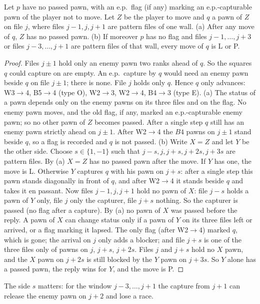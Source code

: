 \begin{wallproof}
\begin{lemma}
Let $p$ have no passed pawn, with an e.p.\ flag (if any) marking an e.p.-capturable pawn of the player not to move. Let $Z$ be the player to move and
$q$ a pawn of $Z$ on file $j$, where files $j-1,j,j+1$ are pattern files of one wall.
(a) After any move of $q$, $Z$ has no passed pawn.
(b) If moreover $p$ has no flag and files $j-1,\dots,j+3$ or files $j-3,\dots,j+1$ are pattern files of that wall, every move of $q$ is
L or P.
\end{lemma}
\begin{proof}
Files $j\pm1$ hold only an enemy pawn two ranks ahead of $q$. So the squares $q$ could capture on are empty. An e.p.\ capture by $q$
would need an enemy pawn beside $q$ on file $j\pm1$; there is none. File $j$ holds only $q$. Hence $q$ only advances: W3$\to$4, B5$\to$4 (type O),
W2$\to$3, W2$\to$4, B4$\to$3 (type E).
(a) The status of a pawn depends only on the enemy pawns on its three files and on the flag. No enemy pawn moves, and the old flag,
if any, marked an e.p.-capturable enemy pawn; so no other pawn of $Z$ becomes passed. After a single step $q$ still has an enemy pawn strictly
ahead on $j\pm1$. After W2$\to$4 the $B4$ pawns on $j\pm1$ stand beside $q$, so a flag is recorded and $q$ is not passed.
(b) Write $X=Z$ and let $Y$ be the other side. Choose $s\in\{1,-1\}$ such that $j-s,j,j+s,j+2s,j+3s$ are pattern files. By (a) $X=Z$ has no passed pawn after the move. If $Y$
has one, the move is L. Otherwise $Y$ captures $q$ with his pawn on $j+s$: after a single step this pawn stands diagonally in front of $q$, and after
W2$\to$4 it stands beside $q$ and takes it en passant. Now files $j-1,j,j+1$ hold no pawn of $X$: file $j-s$ holds a pawn of $Y$ only, file
$j$ only the capturer, file $j+s$ nothing. So the capturer is passed (no flag after a capture). By (a) no pawn of $X$ was passed before the reply. A pawn of $X$ can change status only if a pawn of $Y$ on its three files left or
arrived, or a flag marking it lapsed. The only flag (after W2$\to$4) marked $q$, which is gone; the arrival on $j$ only adds a
blocker; and file $j+s$ is one of the three files only of pawns on $j$, $j+s$, $j+2s$. Files $j$ and $j+s$ hold no $X$ pawn, and the
$X$ pawn on $j+2s$ is still blocked by the $Y$ pawn on $j+3s$. So $Y$ alone has a passed pawn, the reply wins for $Y$, and the move is P.
\end{proof}
The side $s$ matters: for the window $j-3,\dots,j+1$ the capture from $j+1$ can release the enemy pawn on $j+2$ and lose a race.


\end{wallproof}
